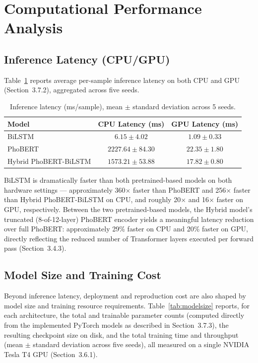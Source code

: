 \documentclass[12pt]{report} %
\begin{document}
\section{Computational Performance Analysis}

\subsection{Inference Latency (CPU/GPU)}
Table~\ref{tab:latency} reports average per-sample inference latency on both CPU and GPU (Section~3.7.2), aggregated across five seeds.

\begin{table}[htbp]
    \centering
    \caption{Inference latency (ms/sample), mean $\pm$ standard deviation across 5 seeds.}
    \label{tab:latency}
    \begin{tabular}{lcc}
        \hline
        \textbf{Model}        & \textbf{CPU Latency (ms)} & \textbf{GPU Latency (ms)} \\
        \hline
        BiLSTM                & $\mathbf{6.15 \pm 4.02}$  & $\mathbf{1.09 \pm 0.33}$  \\
        PhoBERT               & $2227.64 \pm 84.30$       & $22.35 \pm 1.80$          \\
        Hybrid PhoBERT-BiLSTM & $1573.21 \pm 53.88$       & $17.82 \pm 0.80$          \\
        \hline
    \end{tabular}
\end{table}

BiLSTM is dramatically faster than both pretrained-based models on both hardware settings --- approximately 360$\times$ faster than PhoBERT and 256$\times$ faster than Hybrid PhoBERT-BiLSTM on CPU, and roughly 20$\times$ and 16$\times$ faster on GPU, respectively. Between the two pretrained-based models, the Hybrid model's truncated (8-of-12-layer) PhoBERT encoder yields a meaningful latency reduction over full PhoBERT: approximately 29\% faster on CPU and 20\% faster on GPU, directly reflecting the reduced number of Transformer layers executed per forward pass (Section~3.4.3).

\subsection{Model Size and Training Cost}

Beyond inference latency, deployment and reproduction cost are also shaped by
model size and training resource requirements. Table~\ref{tab:modelsize}
reports, for each architecture, the total and trainable parameter counts
(computed directly from the implemented PyTorch models as described in
Section~3.7.3), the resulting checkpoint size on disk, and the total training
time and throughput (mean $\pm$ standard deviation across five seeds), all
measured on a single NVIDIA Tesla T4 GPU (Section~3.6.1).
\end{document}

